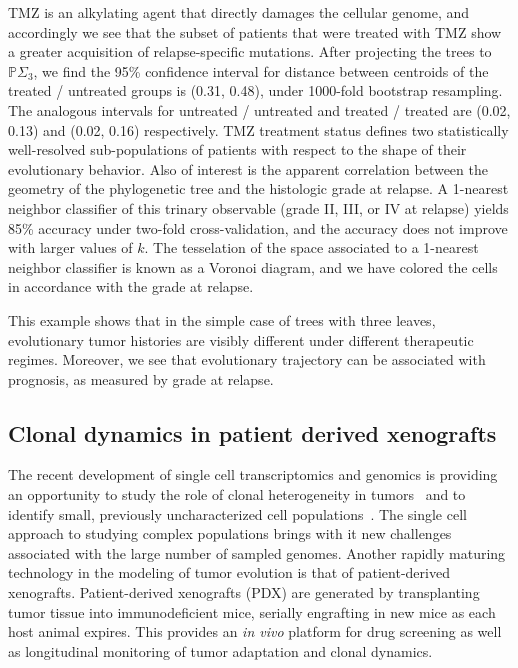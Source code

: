 \documentclass[a4paper,11pt]{article}
\begin{document}
TMZ is an alkylating agent that directly damages the cellular genome, and accordingly we see that the subset of patients that were treated with TMZ show a greater acquisition of relapse-specific mutations.
After projecting the trees to $\mathbb{P}\Sigma_3$, we find the 95\% confidence interval for distance between centroids of the treated / untreated groups is (0.31, 0.48), under 1000-fold bootstrap resampling.
The analogous intervals for untreated / untreated and treated / treated are (0.02, 0.13) and (0.02, 0.16) respectively.
TMZ treatment status defines two statistically well-resolved sub-populations of patients with respect to the shape of their evolutionary behavior.
Also of interest is the apparent correlation between the geometry of the phylogenetic tree and the histologic grade at relapse.
A 1-nearest neighbor classifier of this trinary observable (grade II, III, or IV at relapse) yields 85\% accuracy under two-fold cross-validation, and the accuracy does not improve with larger values of $k$.
The tesselation of the space associated to a 1-nearest neighbor classifier is known as a Voronoi diagram, and we have colored the cells in accordance with the grade at relapse.

This example shows that in the simple case of trees with three leaves, evolutionary tumor histories are visibly different under different therapeutic regimes.
Moreover, we see that evolutionary trajectory can be associated with prognosis, as measured by grade at relapse.

\subsection{Clonal dynamics in patient derived xenografts}\label{sec:xeno}

The recent development of single cell transcriptomics and genomics is providing an opportunity to study the role of clonal heterogeneity in tumors~\cite{navin2011tumour, eirew2014dynamics, patel2014single} and to identify small, previously uncharacterized cell populations~\cite{grun2015single}.
The single cell approach to studying complex populations brings with it new challenges associated with the large number of sampled genomes.
Another rapidly maturing technology in the modeling of tumor evolution is that of patient-derived xenografts.
Patient-derived xenografts (PDX) are generated by transplanting tumor tissue into immunodeficient mice, serially engrafting in new mice as each host animal expires.
This provides an \textit{in vivo} platform for drug screening as well as longitudinal monitoring of tumor adaptation and clonal dynamics.
\end{document}
